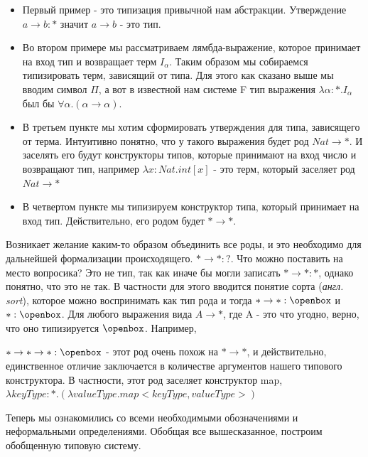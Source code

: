 \begin{itemize}

    \item Первый пример - это типизация привычной нам абстракции. Утверждение $a \rightarrow b : *$ значит $a \rightarrow b$ - это тип. 

    \item Во втором примере мы рассматриваем лямбда-выражение, которое принимает на вход тип и возвращает терм $I_\alpha$. Таким образом мы собираемся типизировать терм, зависящий от типа. Для этого как сказано выше мы вводим символ $\Pi$, а вот в известной нам системе F тип выражения $\lambda \alpha : *.I_\alpha$ был бы $\forall \alpha. (\alpha \rightarrow \alpha)$.

    \item В третьем пункте мы хотим сформировать утверждения для типа, зависящего от терма. Интуитивно понятно, что у такого выражения будет род $Nat \rightarrow *$. И заселять его будут конструкторы типов, которые принимают на вход число и возвращают тип, например $\lambda x : Nat. int [x]$ - это терм, который заселяет род  $Nat \rightarrow *$

    \item В четвертом пункте мы типизируем конструктор типа, который принимает на вход тип. Действительно, его родом будет $* \rightarrow *$.

\end{itemize}

Возникает желание каким-то образом объединить все роды, и это необходимо для дальнейшей формализации происходящего. $* \rightarrow * : ?$. Что можно поставить на место вопросика? Это не тип, так как иначе бы могли записать $* \rightarrow * : *$, однако понятно, что это не так. В частности для этого вводится понятие сорта (\textit{англ. sort}), которое можно воспринимать как тип рода и тогда $* \rightarrow * : \openbox $ и $* : \openbox$. Для любого выражения вида $A \rightarrow *$, где A - это что угодно, верно, что оно типизируется $\openbox$. Например,

$* \rightarrow * \rightarrow * : \openbox$ - этот род очень похож на $* \rightarrow *$, и действительно, единственное отличие заключается в количестве аргументов нашего типового конструктора. В частности, этот род заселяет конструктор map, $\lambda keyType : *. (\lambda valueType. map<keyType, valueType>)$
    
Теперь мы ознакомились со всеми необходимыми обозначениями и неформальными определениями. Обобщая все вышесказанное, построим обобщенную типовую систему.

